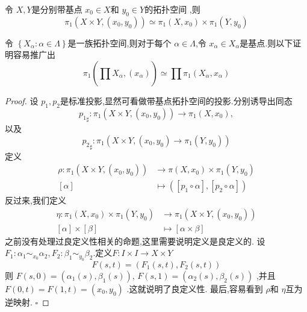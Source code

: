 \documentclass[../../几何与拓扑.tex]{subfiles}
\begin{document}
\begin{theorem}
    令 \(  X,Y  \)是分别带基点 \(  x_0 \in X  \)和 \(  y_0 \in Y  \)的拓扑空间 ,则 \[
    \pi _1 \left( X\times Y,\left( x_0,y_0 \right)  \right)\simeq \pi _1 \left( X,x_0 \right)  \times \pi _1 \left( Y,y_0 \right) 
    \]  
\end{theorem}
\begin{remark}
    令 \(  \left\{ X_{\alpha }:\alpha \in  \Lambda  \right\}  \)是一族拓扑空间,则对于每个 \(   \alpha  \in  \Lambda   \),令 \(  x_{\alpha }\in X_{\alpha }  \)是基点.则以下证明容易推广出 \[
    \pi _1 \left( \prod_{}^{} X_{\alpha },\left( x_{\alpha } \right)   \right)\simeq \prod_{}^{} \pi _1 \left( X_{\alpha },x_{ \alpha } \right)   
    \]   
\end{remark}
\begin{proof}

    设 \(  p_1,p_2  \)是标准投影,显然可看做带基点拓扑空间的投影.分别诱导出同态 \[
    {p_1}_{\sharp }: \pi _1 \left( X\times Y,\left( x_0,y_0 \right)  \right)\to \pi _1 \left( X,x_0 \right)  ,
    \] 以及 \[
    {p_2}_{\sharp }: \pi _1 \left( X\times Y,\left( x_0,y_0 \right)\to \pi _1 \left( Y,y_0 \right)   \right) 
    \]定义 \[
    \begin{aligned}
    \rho : \pi _1 \left( X\times Y,\left( x_0,y_0 \right)  \right)&\to \pi \left( X,x_0 \right)\times \pi _1 \left( Y,y_0 \right)\\ 
    [\alpha ] & \mapsto  \left( [p_1\circ \alpha ], [p_2\circ \alpha ] \right)  
    \end{aligned}
    \]
    反过来,我们定义 \[
    \begin{aligned}
    \eta : \pi _1 \left( X,x_0 \right)\times \pi _1 \left( Y,y_0 \right)&\to \pi _1 \left( X\times Y ,\left( x_0,y_0 \right)  \right)    \\ 
     [\alpha ]\times [\beta ] &\mapsto [\alpha  \times  \beta ]
    \end{aligned}
    \]之前没有处理过良定义性相关的命题,这里需要说明定义是良定义的.
    设 \(  F_1:\alpha _1 \sim_{x_0} \alpha _2 ,F_2:\beta _1 \sim _{y_0}\beta _2   \).定义\(  F : I \times I \to X\times Y   \) \[
    F\left( s,t  \right) =  \left( F_1\left( s,t \right),F_2\left( s,t \right)   \right)  
    \] 则 \( F\left( s,0 \right)= \left( \alpha _1 \left( s \right),\beta _1 \left( s \right)   \right)     \), \(  F\left( s,1 \right)= \left(  \alpha _2 \left( s \right),\beta _2 \left( s \right)   \right)    \)  ,并且 \(  F\left( 0,t \right)= F\left( 1,t \right)= \left( x_0,y_0 \right)     \) .这就说明了良定义性.
    最后,容易看到 \(  \rho   \)和 \(  \eta   \)互为逆映射.  
    \hfill $\square$
\end{proof}
\end{document}

